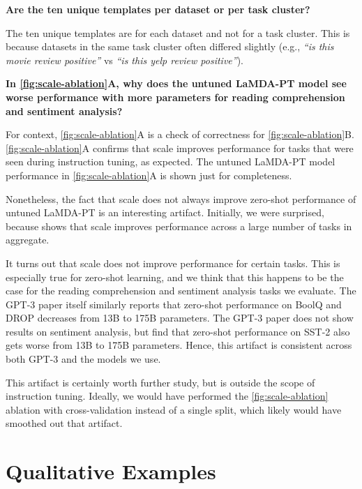 \documentclass{article} %
\newcommand{\baselm}{LaMDA-PT}
\begin{document}
\vspace{4mm}
\textbf{Are the ten unique templates per dataset or per task cluster?} 

The ten unique templates are for each dataset and not for a task cluster. This is because datasets in the same task cluster often differed slightly (e.g., \textit{``is this movie review positive''} vs \textit{``is this yelp review positive''}).

\vspace{4mm}
\textbf{In \cref{fig:scale-ablation}A, why does the untuned \baselm{} model see worse performance with more parameters for reading comprehension and sentiment analysis?}

For context, \cref{fig:scale-ablation}A is a check of correctness for \cref{fig:scale-ablation}B. \cref{fig:scale-ablation}A confirms that scale improves performance for tasks that were seen during instruction tuning, as expected. The untuned \baselm{} model performance in \cref{fig:scale-ablation}A is shown just for completeness.

Nonetheless, the fact that scale does not always improve zero-shot performance of untuned \baselm{} is an interesting artifact. Initially, we were surprised, because \citet{brown2020language} shows that scale improves performance across a large number of tasks in aggregate.

It turns out that scale does not improve performance for certain tasks. This is especially true for zero-shot learning, and we think that this happens to be the case for the reading comprehension and sentiment analysis tasks we evaluate. The GPT-3 paper itself similarly reports that zero-shot performance on BoolQ and DROP decreases from 13B to 175B parameters. The GPT-3 paper does not show results on sentiment analysis, but \citet{holtzman-etal-2021-surface} find that zero-shot performance on SST-2 also gets worse from 13B to 175B parameters. Hence, this artifact is consistent across both GPT-3 and the models we use.

This artifact is certainly worth further study, but is outside the scope of instruction tuning. 
Ideally, we would have performed the \cref{fig:scale-ablation} ablation with cross-validation instead of a single split, which likely would have smoothed out that artifact.


\section{Qualitative Examples}\label{sec:qualitative}
\end{document}
